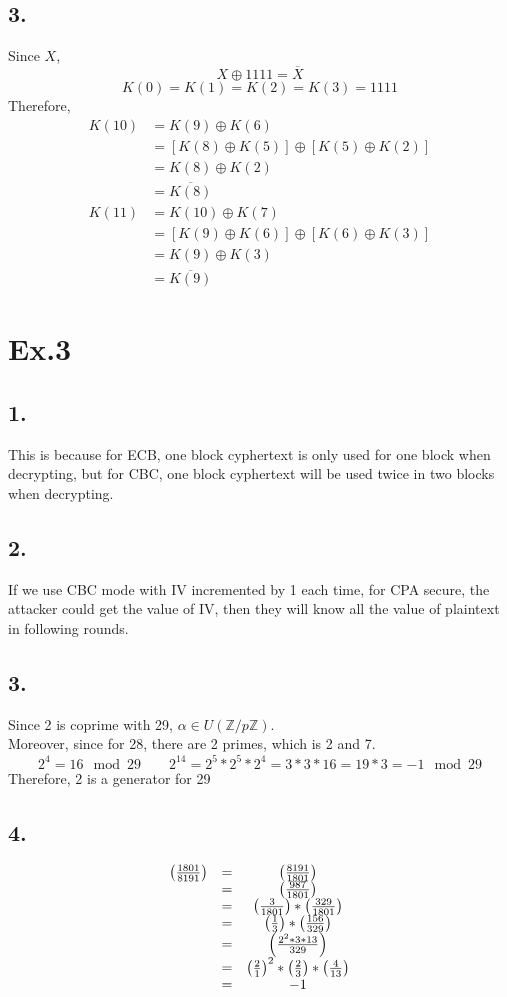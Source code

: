 \documentclass[a4paper,12pt]{journal}
\begin{document}
	 \subsection*{3. }
	 Since $X$, $$X\oplus 1111=\overline{X}$$
	 $$K(0)=K(1)=K(2)=K(3)=1111$$
	 Therefore,
	 \begin{align*}
	 	K(10)&=K(9)\oplus K(6)\\
	 	&=[K(8)\oplus K(5)]\oplus[K(5)\oplus K(2)]\\
	 	&=K(8)\oplus K(2)\\
	 	&=\overline{K(8)}\\
	 	K(11)&=K(10)\oplus K(7)\\
	 	&=[K(9)\oplus K(6)]\oplus[K(6)\oplus K(3)]\\
	 	&=K(9)\oplus K(3)\\
	 	&=\overline{K(9)}
	 \end{align*}
	 \section*{Ex.3}
	 \subsection*{1.}
	 This is because for ECB, one block cyphertext is only used for one block when decrypting, but for CBC, one block cyphertext will be used twice in two blocks when decrypting. 
	 \subsection*{2.}
	 If we use CBC mode with IV incremented by 1 each time, for CPA secure, the attacker could get the value of IV, then they will know all the value of plaintext in following rounds.
	 \subsection*{3.}
	 Since 2 is coprime with 29, $\alpha\in U(\mathbb{Z}/p\mathbb{Z})$.\\
	 Moreover, since for 28, there are 2 primes, which is 2 and 7.  \\
	 $$2^4=16\mod 29\qquad 2^{14}=2^5*2^5*2^4=3*3*16=19*3=-1\mod 29$$
	 Therefore, 2 is a generator for 29
	 \subsection*{4.}
	 $$
	 \begin{array}{c c c}
	 	\left(\frac{1801}{8191}\right)&=&\left(\frac{8191}{1801}\right)\\
	 	 &=&\left(\frac{987}{1801}\right)\\
	 	 &=&\left(\frac{3}{1801}\right)*\left(\frac{329}{1801}\right)\\
	 	 &=&\left(\frac{1}{3}\right)*\left(\frac{156}{329}\right)\\
	 	 &=&\left(\frac{2^2*3*13}{329}\right)\\
	 	 &=&\left(\frac{2}{1}\right)^2*\left(\frac{2}{3}\right)*\left(\frac{4}{13}\right)\\
	 	 &=&-1\\
	 \end{array}
	 $$
\end{document}
